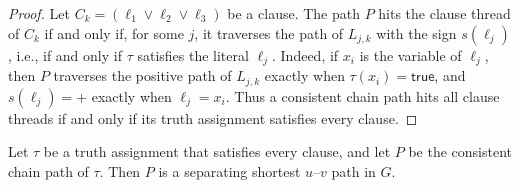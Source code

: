\begin{proof}
Let $C_k = (\ell_1 \vee \ell_2 \vee \ell_3)$ be a clause.
The path $P$ hits the clause thread of $C_k$ if and only if, for some $j$, it traverses the path of $L_{j,k}$ with the sign $s(\ell_j)$, i.e., if and only if $\tau$ satisfies the literal $\ell_j$.
Indeed, if $x_i$ is the variable of $\ell_j$, then $P$ traverses the positive path of $L_{j,k}$ exactly when $\tau(x_i)=\mathsf{true}$, and $s(\ell_j) = +$ exactly when $\ell_j = x_i$.
Thus a consistent chain path hits all clause threads if and only if its truth assignment satisfies every clause.
\end{proof}

\begin{lemma}[Separation]
\label{lem:separating}
Let $\tau$ be a truth assignment that satisfies every clause, and let $P$ be the consistent chain path of $\tau$.
Then $P$ is a separating shortest $u$--$v$ path in $G$.
\end{lemma}

